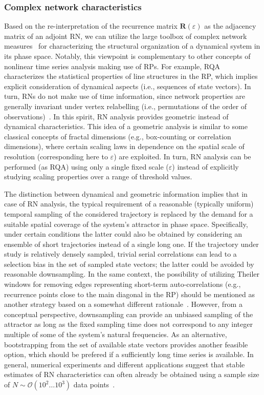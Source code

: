 \subsubsection{Complex network characteristics}\label{sec:rn_measures}

Based on the re-interpretation of the recurrence matrix $\mathbf{R}(\varepsilon)$ as the adjacency matrix of an adjoint RN, we can utilize the large toolbox of complex network measures~\cite{Albert2002,Boccaletti2006,Costa2007,Newman2003} for characterizing the structural organization of a dynamical system in its phase space. Notably, this viewpoint is complementary to other concepts of nonlinear time series analysis making use of RPs. For example, RQA characterizes the statistical properties of line structures in the RP, which implies explicit consideration of dynamical aspects (i.e., sequences of state vectors). In turn, RNs do not make use of time information, since network properties are generally invariant under vertex relabelling (i.e., permutations of the order of observations)~\cite{Donner2010NJP}. In this spirit, RN analysis provides geometric instead of dynamical characteristics. This idea of a geometric analysis is similar to some classical concepts of fractal dimensions (e.g., box-counting or correlation dimensions), where certain scaling laws in dependence on the spatial scale of resolution (corresponding here to $\varepsilon$) are exploited. In turn, RN analysis can be performed (as RQA) using only a single fixed scale ($\varepsilon$) instead of explicitly studying scaling properties over a range of threshold values.

The distinction between dynamical and geometric information implies that in case of RN analysis, the typical requirement of a reasonable (typically uniform) temporal sampling of the considered trajectory is replaced by the demand for a suitable spatial coverage of the system's attractor in phase space. Specifically, under certain conditions the latter could also be obtained by considering an ensemble of short trajectories instead of a single long one. If the trajectory under study is relatively densely sampled, trivial serial correlations can lead to a selection bias in the set of sampled state vectors; the latter could be avoided by reasonable downsampling. In the same context, the possibility of utilizing Theiler windows for removing edges representing short-term auto-correlations (e.g., recurrence points close to the main diagonal in the RP) should be mentioned as another strategy based on a somewhat different rationale~\cite{Donner2010NJP}. However, from a conceptual perspective, downsampling can provide an unbiased sampling of the attractor as long as the fixed sampling time does not correspond to any integer multiple of some of the system's natural frequencies. As an alternative, bootstrapping from the set of available state vectors provides another feasible option, which should be prefered if a sufficiently long time series is available. In general, numerical experiments and different applications suggest that stable estimates of RN characteristics can often already be obtained using a sample size of $N\sim\mathcal{O}(10^2\dots 10^3)$ data points~\cite{Donges2011NPG,Donges2011PNAS}.

